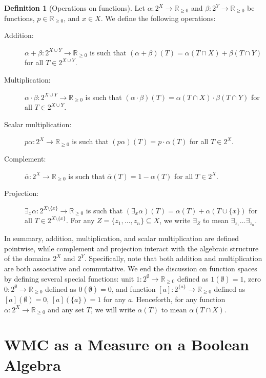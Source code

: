 \documentclass{uai2021} %
\theoremstyle{definition}
\newtheorem{definition}{Definition}
\begin{document}
\begin{definition}[Operations on functions]
  Let $\alpha\colon 2^X \to \mathbb{R}_{\ge 0}$ and $\beta\colon 2^Y \to
  \mathbb{R}_{\ge 0}$ be functions, $p \in \mathbb{R}_{\ge 0}$, and $x \in X$.
  We define the following operations:
  \begin{description}
  \item[Addition:] $\alpha + \beta\colon 2^{X \cup Y} \to \mathbb{R}_{\ge 0}$ is
    such that $(\alpha + \beta)(T) = \alpha(T \cap X) + \beta(T \cap Y)$ for all
    $T \in 2^{X \cup Y}$.
  \item[Multiplication:] $\alpha \cdot \beta\colon 2^{X \cup Y} \to
    \mathbb{R}_{\ge 0}$ is such that $(\alpha \cdot \beta)(T) = \alpha(T \cap X)
    \cdot \beta(T \cap Y)$ for all $T \in 2^{X \cup Y}$.
  \item[Scalar multiplication:] $p\alpha\colon 2^X \to \mathbb{R}_{\ge 0}$ is
    such that $(p\alpha)(T) = p \cdot \alpha(T)$ for all $T \in 2^X$.
  \item[Complement:] $\overline{\alpha}\colon 2^X \to \mathbb{R}_{\ge 0}$ is
    such that $\overline{\alpha}(T) = 1 - \alpha(T)$ for all $T \in 2^X$.
  \item[Projection:] $\exists_x\alpha\colon 2^{X \setminus \{ x \}} \to
    \mathbb{R}_{\ge 0}$ is such that $(\exists_x\alpha)(T) = \alpha(T) +
    \alpha(T \cup \{ x \})$ for all $T \in 2^{X \setminus \{x \}}$. For any $Z =
    \{ z_1, \dots, z_n \} \subseteq X$, we write $\exists_Z$ to mean
    $\exists_{z_1}\dots\exists_{z_n}$.
  \end{description}
\end{definition}

In summary, addition, multiplication, and scalar multiplication are defined
pointwise, while complement and projection interact with the algebraic structure
of the domains $2^X$ and $2^Y$. Specifically, note that both addition and
multiplication are both associative and commutative. We end the discussion on
function spaces by defining several special functions: unit $1\colon 2^\emptyset
\to \mathbb{R}_{\ge 0}$ defined as $1(\emptyset) = 1$, zero $0\colon 2^\emptyset
\to \mathbb{R}_{\ge 0}$ defined as $0(\emptyset) = 0$, and function $[a]\colon
2^{\{a\}} \to \mathbb{R}_{\ge 0}$ defined as $[a](\emptyset) = 0$, $[a](\{a\}) =
1$ for any $a$. Henceforth, for any function $\alpha\colon 2^X \to
\mathbb{R}_{\ge 0}$ and any set $T$, we will write $\alpha(T)$ to mean $\alpha(T
\cap X)$.

\section{WMC as a Measure on a Boolean Algebra} \label{sec:wmc_as_measure}
\end{document}
